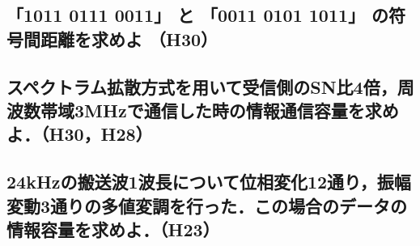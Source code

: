 \newpage
\subsection{「1011 0111 0011」 と 「0011 0101 1011」 の符号間距離を求めよ （H30）}
\vspace{7cm}

\subsection{スペクトラム拡散方式を用いて受信側のSN比4倍，周波数帯域3MHzで通信した時の情報通信容量を求めよ．（H30，H28）}
\vspace{7cm}

\subsection{24kHzの搬送波1波長について位相変化12通り，振幅変動3通りの多値変調を行った．この場合のデータの情報容量を求めよ．（H23）}
\vspace{7cm}


